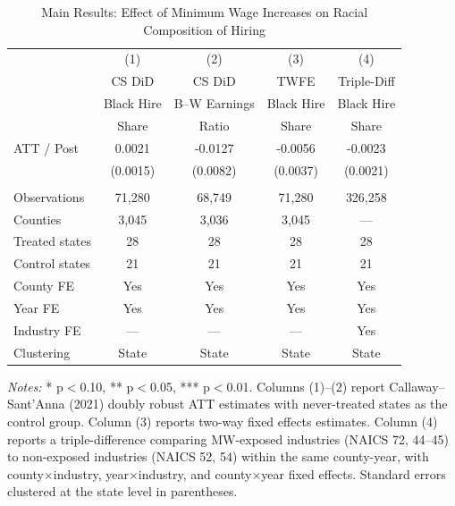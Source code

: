 
\begin{table}[H]
\centering
\caption{Main Results: Effect of Minimum Wage Increases on Racial Composition of Hiring}
\label{tab:main}
\begin{threeparttable}
\begin{tabular}{lcccc}
\toprule
 & (1) & (2) & (3) & (4) \\
 & CS DiD & CS DiD & TWFE & Triple-Diff \\
 & Black Hire & B--W Earnings & Black Hire & Black Hire \\
 & Share & Ratio & Share & Share \\
\midrule
ATT / Post & 0.0021 & -0.0127 & -0.0056 & -0.0023 \\
 & (0.0015) & (0.0082) & (0.0037) & (0.0021) \\
\\
Observations & 71,280 & 68,749 & 71,280 & 326,258 \\
Counties & 3,045 & 3,036 & 3,045 & --- \\
Treated states & 28 & 28 & 28 & 28 \\
Control states & 21 & 21 & 21 & 21 \\
County FE & Yes & Yes & Yes & Yes \\
Year FE & Yes & Yes & Yes & Yes \\
Industry FE & --- & --- & --- & Yes \\
Clustering & State & State & State & State \\
\bottomrule
\end{tabular}
\begin{tablenotes}[flushleft]
\small
\item \textit{Notes:} * p$<$0.10, ** p$<$0.05, *** p$<$0.01. Columns (1)--(2) report Callaway--Sant'Anna (2021) doubly robust ATT estimates with never-treated states as the control group. Column (3) reports two-way fixed effects estimates. Column (4) reports a triple-difference comparing MW-exposed industries (NAICS 72, 44--45) to non-exposed industries (NAICS 52, 54) within the same county-year, with county$\times$industry, year$\times$industry, and county$\times$year fixed effects. Standard errors clustered at the state level in parentheses.
\end{tablenotes}
\end{threeparttable}
\end{table}

